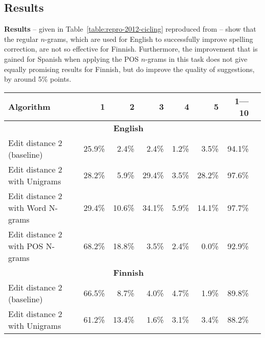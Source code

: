 \documentclass[officiallayout,final]{unihelcompling}
\begin{document}
\subsection{Results}

\textbf{Results} -- given in Table~\ref{table:repro-2012-cicling} reproduced
from  -- show that the regular \(n\)-grams,
which are used for English to successfully improve spelling correction, are not
so effective for Finnish.  Furthermore, the improvement that is gained for
Spanish when applying the POS \(n\)-grams in this task does not give equally
promising results for Finnish, but do improve the quality of suggestions, by
around 5\% points.

\begin{table}
\centering
      \begin{tabular}{lrrrrrrr}
        \hline
        Algorithm & 1 & 2 & 3 & 4 & 5 & 1---10 \\
        \hline
        \multicolumn{7}{c}{\textbf{English}} \\
        \hline
        Edit distance 2 (baseline) 
& 25.9\% & 2.4\% & 2.4\% & 1.2\% & 3.5\% & 94.1\% \\
        \hline
        Edit distance 2 with Unigrams 
& 28.2\% & 5.9\% & 29.4\% & 3.5\% & 28.2\% & 97.6\% \\
        \hline
        Edit distance 2 with Word N-grams 
& 29.4\% & 10.6\% & 34.1\% & 5.9\% & 14.1\% & 97.7\% \\
        \hline
        Edit distance 2 with POS N-grams 
& 68.2\% & 18.8\% & 3.5\% & 2.4\% & 0.0\% & 92.9\% \\
\hline
        \multicolumn{7}{c}{\textbf{Finnish}} \\
        \hline
        Edit distance 2 (baseline)
& 66.5\% & 8.7\% & 4.0\% & 4.7\% & 1.9\% & 89.8\% \\
        \hline
        Edit distance 2 with Unigrams 
& 61.2\% & 13.4\% & 1.6\% & 3.1\% & 3.4\% & 88.2\% \\

\end{tabular}
\end{table}
\end{document}
